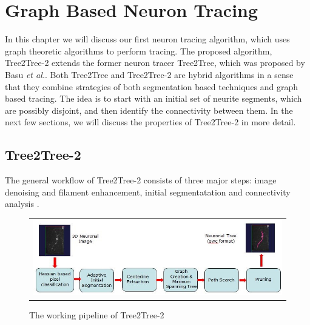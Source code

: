 \chapter{Graph Based Neuron Tracing} %

\label{T2T2_chapter} %


In this chapter we will discuss our first neuron tracing algorithm, which uses graph theoretic algorithms to perform tracing. The proposed algorithm, Tree2Tree-2\cite{mukherjee_T2T_2} extends the former neuron tracer Tree2Tree, which was proposed by Basu \textit{et al.}\cite{basu_T2T_journal}. Both Tree2Tree and Tree2Tree-2 are hybrid algorithms in a sense that they combine strategies of both segmentation based techniques and graph based tracing. The idea is to start with an initial set of neurite segments, which are possibly disjoint, and then identify the connectivity between them. In the next few sections, we will discuss the properties of Tree2Tree-2 in more detail.

\section{Tree2Tree-2}
The general workflow of Tree2Tree-2  consists of three major steps: image denoising and filament enhancement, initial segmentatation and connectivity analysis .
\begin{figure}[t]
\centering
\begin{tabular}{c}
\includegraphics[width=0.8\linewidth]{./images/ch3/T2T2_pipeline.jpg}	
\end{tabular}
\caption[Tree2Tree-2: workflow]{The working pipeline of Tree2Tree-2}
\label{fig:T2T2_pipeline}
\end{figure}


